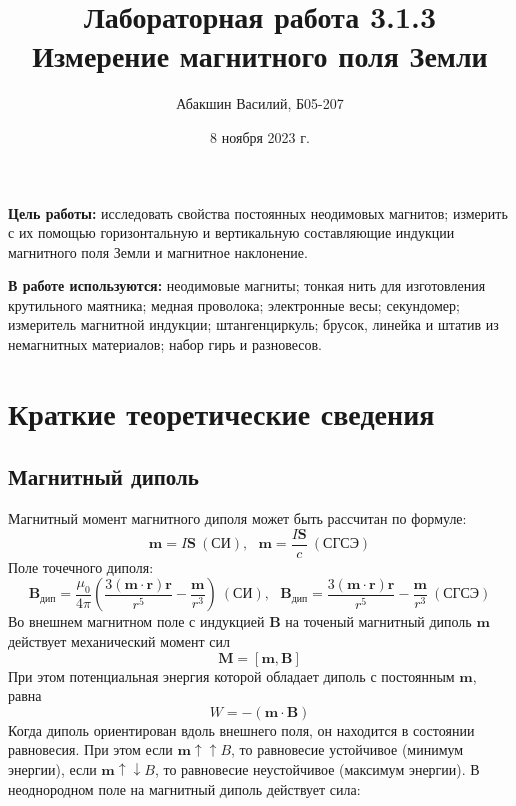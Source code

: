 \documentclass[a4paper, 12pt]{article}
\title{Лабораторная работа 3.1.3 \\ Измерение магнитного поля Земли}
\author{Абакшин Василий, Б05-207}
\date{8 ноября 2023 г.}
\begin{document}
	\maketitle
	
	\textbf{Цель работы:} исследовать свойства постоянных неодимовых магнитов; измерить с их помощью горизонтальную и вертикальную составляющие индукции магнитного поля Земли и магнитное наклонение.
	
	\textbf{В работе используются:} неодимовые магниты; тонкая нить для изготовления крутильного маятника; медная проволока; электронные весы; секундомер; измеритель магнитной индукции; штангенциркуль; брусок, линейка и штатив из немагнитных материалов; набор гирь и разновесов.
	
	\section*{Краткие теоретические сведения}
	
	\subsection*{Магнитный диполь}
	Магнитный момент магнитного диполя может быть рассчитан по формуле:
	\[\mathbf{m} = I\mathbf{S} \ (\text{СИ}), \ \ \ \mathbf{m} = \frac{I\mathbf{S}}{c} \ (\text{СГСЭ})\]
	Поле точечного диполя:
	\[\textbf{B}_\text{дип} = \frac{\mu_0}{4\pi}\left(\frac{3(\mathbf{m} \cdot \textbf{r})\textbf{r}}{r^5} - \frac{\textbf{m}}{r^3}\right) \ (\text{СИ}), \ \ \ \textbf{B}_\text{дип} = \frac{3(\mathbf{m} \cdot \textbf{r})\textbf{r}}{r^5} - \frac{\textbf{m}}{r^3} \ (\text{СГСЭ}) \]
	Во внешнем магнитном поле с индукцией $\textbf{B}$ на точеный магнитный диполь $\mathbf{m}$ действует механический момент сил $$\textbf{M}=[\mathbf{m}, \textbf{B}]$$
	При этом потенциальная энергия которой обладает диполь с постоянным $\mathbf{m}$, равна 
	$$W = -(\mathbf{m} \cdot \textbf{B})$$
	Когда диполь ориентирован вдоль внешнего поля, он находится в состоянии равновесия. При этом если $\mathbf{m} \uparrow \uparrow B$, то равновесие устойчивое (минимум энергии), если $\mathbf{m} \uparrow \downarrow B$, то равновесие неустойчивое (максимум энергии).
	В неоднородном поле на магнитный диполь действует сила: 
	
\end{document}
